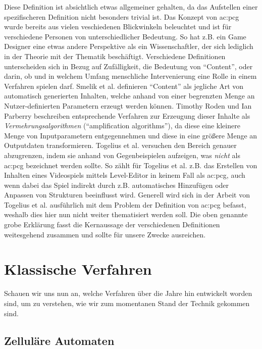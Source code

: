 Diese Definition ist absichtlich etwas allgemeiner gehalten, da das Aufstellen einer spezifischeren Definition nicht
besonders trivial ist. Das Konzept von \gls{ac:pcg} wurde bereits aus vielen veschiedenen Blickwinkeln beleuchtet und
ist für verschiedene Personen von unterschiedlicher Bedeutung. So hat z.B. ein Game Designer eine etwas andere Perspektive
als ein Wissenschaftler, der sich lediglich in der Theorie mit der Thematik beschäftigt. \cite{9_togelius_et_al}
Verschiedene Definitionen unterscheiden sich in Bezug auf Zufälligkeit, die Bedeutung von ``Content'', oder darin, ob und
in welchem Umfang menschliche Intervenierung eine Rolle in einem Verfahren spielen darf. Smelik et al. definieren ``Content''
als jegliche Art von automatisch generierten Inhalten, welche anhand von einer begrenzten Menge an Nutzer-definierten
Parametern erzeugt werden können. \cite{26_smelik_et_al} Timothy Roden und Ian Parberry beschreiben entsprechende Verfahren zur
Erzeugung dieser Inhalte als \textit{Vermehrungsalgorithmen} (``amplification algorithms''), da diese eine kleinere Menge
von Inputparametern entgegennehmen und diese in eine größere Menge an Outputdaten transformieren. \cite{27_roden_parberry}
Togelius et al. \cite{9_togelius_et_al} versuchen den Bereich genauer abzugrenzen, indem sie anhand von Gegenbeispielen
aufzeigen, was \textit{nicht} als \gls{ac:pcg} bezeichnet werden sollte. So zählt für Togelius et al. z.B. das Erstellen von
Inhalten eines Videospiels mittels Level-Editor in keinem Fall als \gls{ac:pcg}, auch wenn dabei das Spiel indirekt durch z.B.
automatisches Hinzufügen oder Anpassen von Strukturen beeinflusst wird. Generell wird sich in der Arbeit
von Togelius et al. \cite{9_togelius_et_al} ausführlich mit dem Problem der Definition von \gls{ac:pcg} befasst, weshalb
dies hier nun nicht weiter thematisiert werden soll. Die oben genannte grobe Erklärung fasst die Kernaussage der verschiedenen
Definitionen weitesgehend zusammen und sollte für unsere Zwecke ausreichen.

\section{Klassische Verfahren}
Schauen wir uns nun an, welche Verfahren über die Jahre hin entwickelt worden sind, um zu verstehen,
wie wir zum momentanen Stand der Technik gekommen sind.

\subsection{Zelluläre Automaten}

